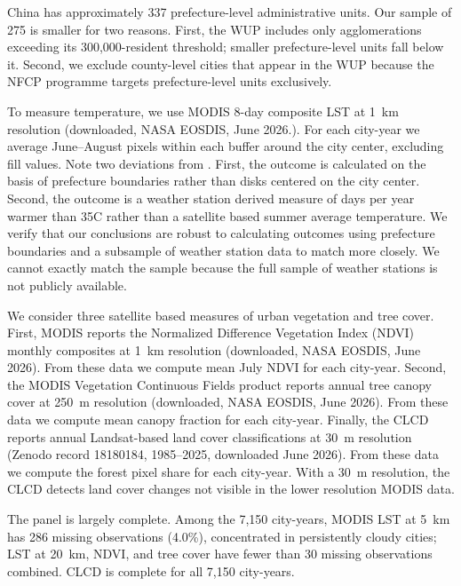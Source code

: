 \documentclass[12pt]{article}
\begin{document}
China has approximately 337 prefecture-level administrative units.  Our sample
of 275 is smaller for two reasons.  First, the WUP includes only agglomerations
exceeding its 300,000-resident threshold; smaller prefecture-level units fall
below it.  Second, we exclude county-level cities that appear in the WUP because the NFCP programme targets prefecture-level units
exclusively.

To measure temperature, we use MODIS 8-day composite LST
at 1~km resolution \citep{Wan2021} (downloaded, NASA EOSDIS, June 2026.).  For each city-year we average June--August pixels within each buffer around the city center, excluding fill values. Note two deviations from \citet{Ma2026}. First, the \citet{Ma2026} outcome is calculated on the basis of prefecture boundaries rather than disks centered on the city center. Second, the  \citet{Ma2026} outcome is a weather station derived measure of  days per year warmer than 35\degree C rather than a satellite based summer average temperature. We verify that our conclusions are robust to calculating outcomes using prefecture boundaries and a subsample of weather station data to match \citet{Ma2026} more closely.  We cannot exactly match the \citet{Ma2026} sample because the full sample of weather stations is not publicly available.

We consider three satellite based measures of urban vegetation and tree cover. First, MODIS reports the Normalized Difference Vegetation Index (NDVI) monthly  composites at 1~km
resolution \citep{Didan2021}(downloaded, NASA EOSDIS, June 2026).  From these data we compute mean July NDVI for each city-year. Second, the MODIS Vegetation Continuous Fields product reports annual tree canopy cover at 250~m resolution \citep{DiMiceli2021} (downloaded, NASA EOSDIS, June 2026).  From these data we compute mean canopy fraction for each city-year. Finally, the CLCD reports annual Landsat-based land cover classifications at 30~m resolution \citep{Yang2021} (Zenodo record 18180184, 1985--2025, downloaded June 2026). From these data we compute the forest pixel share for each city-year.  With a 30~m resolution, the CLCD detects land cover changes not visible in the lower resolution MODIS data.

The panel is largely complete.  Among the 7,150 city-years, MODIS LST at 5~km
has 286 missing observations (4.0\%), concentrated in persistently cloudy
cities; LST at 20~km, NDVI, and tree cover have fewer than 30 missing
observations combined.  CLCD is complete for all 7,150 city-years.
\end{document}
